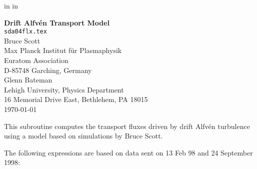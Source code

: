
\headheight 0pt \headsep 0pt          
\topmargin 0pt   in
\oddsidemargin 0pt  in

\newcommand{\Partial}[2]{\frac{\partial #1}{\partial #2}}
\newcommand{\jacobian}{{\cal J}}



\begin{center} 
\large {\bf Drift Alfv\'{e}n Transport Model} \\
\normalsize  {\tt sda04flx.tex} \\
\vspace{1pc}
Bruce Scott \\
Max Planck Institut f\"{u}r Plasmaphysik \\
Euratom Association \\
D-85748 Garching, Germany \\
\vspace{1pc}
Glenn Bateman \\
Lehigh University, Physics Department \\
16 Memorial Drive East, Bethlehem, PA 18015 \\
\vspace{1pc}
\today
\end{center}

This subroutine computes the transport fluxes driven by
drift Alfv\'{e}n turbulence using a model based on
simulations by Bruce Scott.

The following expressions are based on data sent on 13 Feb 98
and 24 September 1998:

